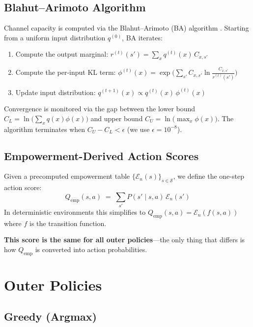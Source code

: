 \documentclass[11pt]{article}
\newcommand{\E}{\mathcal{E}}
\newcommand{\Qemp}{Q_{\mathrm{emp}}}
\begin{document}
\subsection{Blahut--Arimoto Algorithm}

Channel capacity is computed via the Blahut--Arimoto (BA) algorithm
\cite{blahut1972computation}.  Starting from a uniform input
distribution $q^{(0)}$, BA iterates:

\begin{enumerate}
  \item Compute the output marginal:
    $r^{(t)}(s') = \sum_x q^{(t)}(x)\, C_{x,s'}$
  \item Compute the per-input KL term:
    $\phi^{(t)}(x) = \exp\!\Big(\sum_{s'} C_{x,s'} \ln
    \frac{C_{x,s'}}{r^{(t)}(s')}\Big)$
  \item Update input distribution:
    $q^{(t+1)}(x) \propto q^{(t)}(x)\, \phi^{(t)}(x)$
\end{enumerate}

Convergence is monitored via the gap between the lower bound
$C_L = \ln\!\big(\sum_x q(x)\phi(x)\big)$ and upper bound
$C_U = \ln\!\big(\max_x \phi(x)\big)$.  The algorithm terminates when
$C_U - C_L < \epsilon$ (we use $\epsilon = 10^{-8}$).

\subsection{Empowerment-Derived Action Scores}

Given a precomputed empowerment table
$\{\E_n(s)\}_{s \in \mathcal{S}}$, we define the one-step action
score:
\begin{equation}
  \Qemp(s, a) \;=\; \sum_{s'} P(s' \mid s, a)\, \E_n(s')
  \label{eq:qemp}
\end{equation}
In deterministic environments this simplifies to
$\Qemp(s,a) = \E_n(f(s,a))$ where $f$ is the transition function.

\textbf{This score is the same for all outer policies}---the only
thing that differs is how $\Qemp$ is converted into action
probabilities.

\section{Outer Policies}
\label{sec:policies}

\subsection{Greedy (Argmax)}
\end{document}
